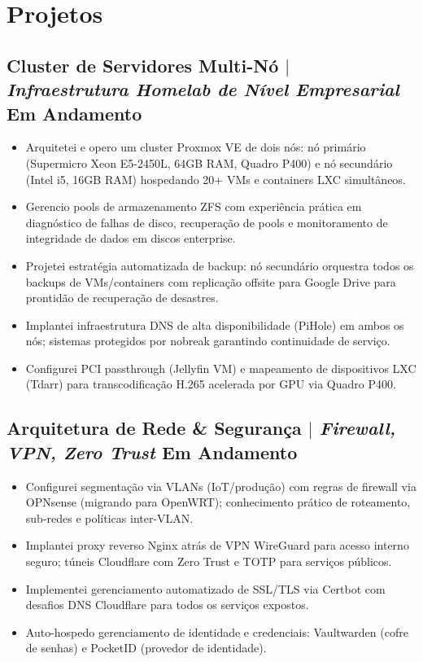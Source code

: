 \documentclass[10pt]{article}
\begin{document}
\section{Projetos}
\subsection{Cluster de Servidores Multi-N\'{o} $|$ \normalfont\textit{Infraestrutura Homelab de N\'{i}vel Empresarial} \hfill Em Andamento}
\begin{itemize}
	\item Arquitetei e opero um cluster Proxmox VE de dois n\'{o}s: n\'{o} prim\'{a}rio (Supermicro Xeon E5-2450L, 64GB RAM, Quadro P400) e n\'{o} secund\'{a}rio (Intel i5, 16GB RAM) hospedando 20+ VMs e containers LXC simult\^{a}neos.
	\item Gerencio pools de armazenamento ZFS com experi\^{e}ncia pr\'{a}tica em diagn\'{o}stico de falhas de disco, recupera\c{c}\~{a}o de pools e monitoramento de integridade de dados em discos enterprise.
	\item Projetei estrat\'{e}gia automatizada de backup: n\'{o} secund\'{a}rio orquestra todos os backups de VMs/containers com replica\c{c}\~{a}o offsite para Google Drive para prontid\~{a}o de recupera\c{c}\~{a}o de desastres.
	\item Implantei infraestrutura DNS de alta disponibilidade (PiHole) em ambos os n\'{o}s; sistemas protegidos por nobreak garantindo continuidade de servi\c{c}o.
	\item Configurei PCI passthrough (Jellyfin VM) e mapeamento de dispositivos LXC (Tdarr) para transcodifica\c{c}\~{a}o H.265 acelerada por GPU via Quadro P400.
\end{itemize}

\subsection{Arquitetura de Rede \& Seguran\c{c}a $|$ \normalfont\textit{Firewall, VPN, Zero Trust} \hfill Em Andamento}
\begin{itemize}
	\item Configurei segmenta\c{c}\~{a}o via VLANs (IoT/produ\c{c}\~{a}o) com regras de firewall via OPNsense (migrando para OpenWRT); conhecimento pr\'{a}tico de roteamento, sub-redes e pol\'{i}ticas inter-VLAN.
	\item Implantei proxy reverso Nginx atr\'{a}s de VPN WireGuard para acesso interno seguro; t\'{u}neis Cloudflare com Zero Trust e TOTP para servi\c{c}os p\'{u}blicos.
	\item Implementei gerenciamento automatizado de SSL/TLS via Certbot com desafios DNS Cloudflare para todos os servi\c{c}os expostos.
	\item Auto-hospedo gerenciamento de identidade e credenciais: Vaultwarden (cofre de senhas) e PocketID (provedor de identidade).
\end{itemize}
\end{document}
